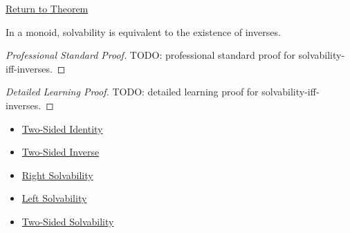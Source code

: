 \newpage
{}
\label{prf:solvability-iff-inverses}

\begin{remark*}[Return]
\hyperref[prop:solvability-iff-inverses]{Return to Theorem}
\end{remark*}

\begin{proposition*}
In a monoid, solvability is equivalent to the existence of inverses.
\end{proposition*}

\begin{proof}[Professional Standard Proof]
\LRAProofBodyStart
TODO: professional standard proof for solvability-iff-inverses.
\end{proof}

\begin{proof}[Detailed Learning Proof]
\LRAProofBodyStart
TODO: detailed learning proof for solvability-iff-inverses.
\end{proof}

\begin{remark*}
\end{remark*}

\begin{dependencies}
\begin{itemize}
  \item \hyperref[def:two-sided-identity]{Two-Sided Identity}
  \item \hyperref[def:two-sided-inverse]{Two-Sided Inverse}
  \item \hyperref[def:right-solvability]{Right Solvability}
  \item \hyperref[def:left-solvability]{Left Solvability}
  \item \hyperref[def:two-sided-solvability]{Two-Sided Solvability}
\end{itemize}
\end{dependencies}

\clearpage
